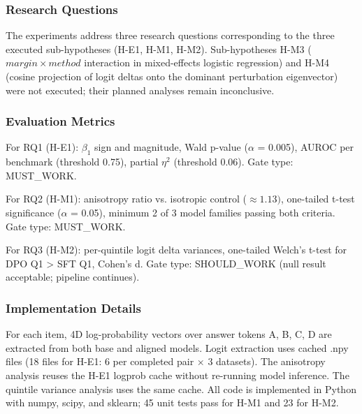 
\subsubsection{Research Questions}

The experiments address three research questions corresponding to the three executed sub-hypotheses (H-E1, H-M1, H-M2). Sub-hypotheses H-M3 ($margin\times method$ interaction in mixed-effects logistic regression) and H-M4 (cosine projection of logit deltas onto the dominant perturbation eigenvector) were not executed; their planned analyses remain inconclusive.

\subsubsection{Evaluation Metrics}

For RQ1 (H-E1): $\beta _1$ sign and magnitude, Wald p-value ($\alpha$ = 0.005), AUROC per benchmark (threshold 0.75), partial $\eta^2$ (threshold 0.06). Gate type: MUST\_WORK.

For RQ2 (H-M1): anisotropy ratio vs. isotropic control ($\approx 1.13)$, one-tailed t-test significance ($\alpha$ = 0.05), minimum 2 of 3 model families passing both criteria. Gate type: MUST\_WORK.

For RQ3 (H-M2): per-quintile logit delta variances, one-tailed Welch's t-test for DPO Q1 > SFT Q1, Cohen's d. Gate type: SHOULD\_WORK (null result acceptable; pipeline continues).

\subsubsection{Implementation Details}

For each item, 4D log-probability vectors over answer tokens {A, B, C, D} are extracted from both base and aligned models. Logit extraction uses cached .npy files (18 files for H-E1: 6 per completed pair $\times$ 3 datasets). The anisotropy analysis reuses the H-E1 logprob cache without re-running model inference. The quintile variance analysis uses the same cache. All code is implemented in Python with numpy, scipy, and sklearn; 45 unit tests pass for H-M1 and 23 for H-M2.

